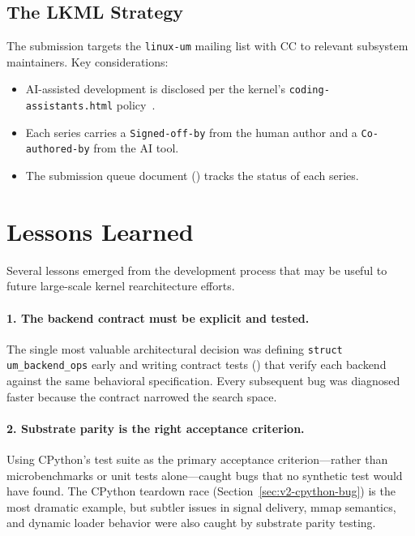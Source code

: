 \subsection{The LKML Strategy}

The submission targets the \texttt{linux-um} mailing list with
CC to relevant subsystem maintainers.  Key considerations:

\begin{itemize}[leftmargin=2em]
  \item AI-assisted development is disclosed per the kernel's
    \texttt{coding-assistants.html} policy~\cite{coding-assistants}.
  \item Each series carries a \texttt{Signed-off-by} from the human
    author and a \texttt{Co-authored-by} from the AI tool.
  \item The submission queue document
    () tracks the
    status of each series.
\end{itemize}


\section{Lessons Learned}
\label{sec:v2-lessons}

Several lessons emerged from the development process that may be
useful to future large-scale kernel rearchitecture efforts.

\paragraph{1. The backend contract must be explicit and tested.}
The single most valuable architectural decision was defining
\texttt{struct um\_backend\_ops} early and writing contract tests
() that verify each backend
against the same behavioral specification.  Every subsequent bug
was diagnosed faster because the contract narrowed the search space.

\paragraph{2. Substrate parity is the right acceptance criterion.}
Using CPython's test suite as the primary acceptance criterion---rather
than microbenchmarks or unit tests alone---caught bugs that no
synthetic test would have found.  The CPython teardown race
(Section~\ref{sec:v2-cpython-bug}) is the most dramatic example, but
subtler issues in signal delivery, mmap semantics, and dynamic loader
behavior were also caught by substrate parity testing.

